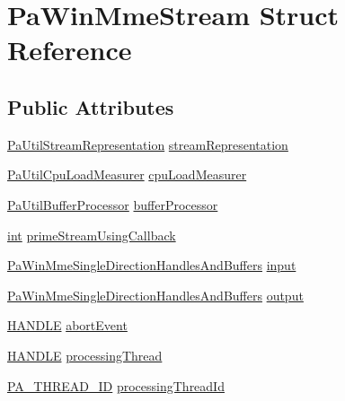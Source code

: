 \hypertarget{struct_pa_win_mme_stream}{}\section{Pa\+Win\+Mme\+Stream Struct Reference}
\label{struct_pa_win_mme_stream}
\subsection*{Public Attributes}
\begin{DoxyCompactItemize}
\item 
\hyperlink{struct_pa_util_stream_representation}{Pa\+Util\+Stream\+Representation} \hyperlink{struct_pa_win_mme_stream_a7b3dc9390563613dd3978a278998bc92}{stream\+Representation}
\item 
\hyperlink{struct_pa_util_cpu_load_measurer}{Pa\+Util\+Cpu\+Load\+Measurer} \hyperlink{struct_pa_win_mme_stream_aded3e078636a595d9da3494779adc0cc}{cpu\+Load\+Measurer}
\item 
\hyperlink{struct_pa_util_buffer_processor}{Pa\+Util\+Buffer\+Processor} \hyperlink{struct_pa_win_mme_stream_a5849490d9f32f00c3433cdaaec5a2e46}{buffer\+Processor}
\item 
\hyperlink{xmltok_8h_a5a0d4a5641ce434f1d23533f2b2e6653}{int} \hyperlink{struct_pa_win_mme_stream_a1568e3c796350c9cf01640ad1aa70c66}{prime\+Stream\+Using\+Callback}
\item 
\hyperlink{struct_pa_win_mme_single_direction_handles_and_buffers}{Pa\+Win\+Mme\+Single\+Direction\+Handles\+And\+Buffers} \hyperlink{struct_pa_win_mme_stream_adc282809ee20cc9326da74032e2cc175}{input}
\item 
\hyperlink{struct_pa_win_mme_single_direction_handles_and_buffers}{Pa\+Win\+Mme\+Single\+Direction\+Handles\+And\+Buffers} \hyperlink{struct_pa_win_mme_stream_ae1cdc398a298c9b269ff529186a0fb52}{output}
\item 
\hyperlink{_sound_touch_d_l_l_8h_aa8c0374618b33785ccb02f74bcfebc46}{H\+A\+N\+D\+LE} \hyperlink{struct_pa_win_mme_stream_acc772979c75ce705491427874a42a59d}{abort\+Event}
\item 
\hyperlink{_sound_touch_d_l_l_8h_aa8c0374618b33785ccb02f74bcfebc46}{H\+A\+N\+D\+LE} \hyperlink{struct_pa_win_mme_stream_a3c0f314f711da19024f91b314129690c}{processing\+Thread}
\item 
\hyperlink{pa__win__wmme_8c_af90ebf49f32d984f4cea06ca90506e40}{P\+A\+\_\+\+T\+H\+R\+E\+A\+D\+\_\+\+ID} \hyperlink{struct_pa_win_mme_stream_a02e208a29b618ee4bf251c1fe5b232fe}{processing\+Thread\+Id}

\end{DoxyCompactItemize}
